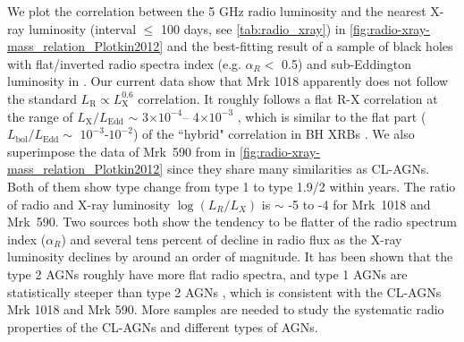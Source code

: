 \documentclass[twocolumn]{aastex63}
\begin{document}
We plot the correlation between the 5 GHz radio luminosity and the nearest X-ray luminosity (interval $\le$ 100 days, see \autoref{tab:radio_xray}) in \autoref{fig:radio-xray-mass_relation_Plotkin2012} and the best-fitting result of a sample of black holes with flat/inverted radio spectra index (e.g. $\alpha_R <$ 0.5) and sub-Eddington luminosity in \citet{2012MNRAS.419..267P}. Our current data show that Mrk 1018 apparently does not follow the standard $L_\mathrm{R}\propto L_\mathrm{X}^{0.6}$ correlation. It roughly follows a flat R-X correlation at the range of $L_\mathrm{X}/L_\mathrm{Edd}$ $\sim$ 3$\times 10^{-4}$-- 4$\times 10^{-3}$ , which is similar to the flat part ($L_\mathrm{bol}/L_\mathrm{Edd} \sim$ $10^{-3}$-$10^{-2}$) of the ``hybrid" correlation in BH XRBs \citep[see e.g.][]{2018MNRAS.473.4122E,2020ApJ...891...31X}. We also superimpose the data of Mrk~590 from \citet[][]{2016MNRAS.460..304K} in \autoref{fig:radio-xray-mass_relation_Plotkin2012} since they share many similarities as CL-AGNs. Both of them show type change from type 1 to type 1.9/2 within years. The ratio of radio and X-ray luminosity $\log(L_R/L_X)$ is $\sim$ -5 to -4 for Mrk~1018 and Mrk~590. Two sources both show the tendency to be flatter of the radio spectrum index ($\alpha_R$) and several tens percent of decline in radio flux as the X-ray luminosity declines by around an order of magnitude. It has been shown that the type 2 AGNs roughly have more flat radio spectra, and type 1 AGNs are statistically steeper than type 2 AGNs \citep[e.g.][]{2019MNRAS.485.3185C}, which is consistent with the CL-AGNs Mrk 1018 and Mrk 590.  More samples are needed to study the systematic radio properties of the CL-AGNs and different types of AGNs.
\end{document}
